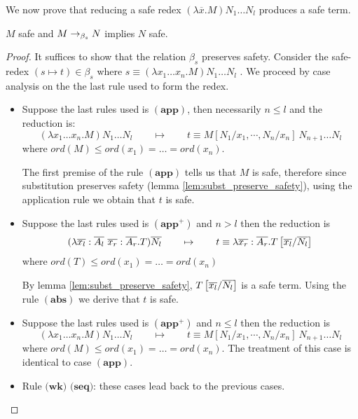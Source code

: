We now prove that reducing a safe redex $(\lambda \overline{x} . M) N_1 \ldots N_l$ produces a safe term.

\begin{lem}
$M$ safe and $M \rightarrow_{\beta_s} N$ implies $N$ safe.
\end{lem}

\begin{proof}
It suffices to show that the relation $\beta_s$ preserves safety.
Consider the safe-redex $(s\mapsto t) \in \beta_s$ where $ s \equiv (\lambda x_1 \ldots x_n . M) N_1 \ldots N_l $ .
We proceed by case analysis on the the last rule used to form the redex.
\begin{itemize}
\item Suppose the last rules used is $\mathbf{(app)}$, then necessarily $n\leq l$ and the reduction is:
$$(\lambda x_1 \ldots x_n . M) N_1 \ldots N_l \qquad \mapsto  \qquad t \equiv M[N_1 / x_1 , \cdots, N_n / x_n]\ N_{n+1} \ldots N_l$$
where $ord(M) \leq ord(x_1) = \ldots = ord(x_n)$.

The first premise of the rule $\mathbf{(app)}$ tells us that $M$ is safe,
therefore since substitution preserves safety (lemma
\ref{lem:subst_preserve_safety}), using the application rule we obtain that $t$ is safe.

\item Suppose the last rules used is $\mathbf{(app^+)}$ and $n> l$ then the reduction is
$$ (\lambda \overline{x_l} : \overline{A_l} \
\overline{x_r}: \overline{A_r} . T) \overline{N_l} \qquad \mapsto
\qquad t \equiv \lambda \overline{x_r}: \overline{A_r} .
T\left[ \overline{x_l}/\overline{N_l} \right]
$$
where $ord(T) \leq ord(x_1) = \ldots = ord(x_n)$

By lemma \ref{lem:subst_preserve_safety}, $T\left[ \overline{x_l}/\overline{N_l} \right]$ is a safe term.
Using the rule $\mathbf{(abs)}$ we derive that $t$ is safe.

\item Suppose the last rules used is $\mathbf{(app^+)}$ and $n\leq l$ then the reduction is
$$(\lambda x_1 \ldots x_n . M) N_1 \ldots N_l \qquad \mapsto \qquad t \equiv M[N_1 / x_1 , \cdots, N_n / x_n]\ N_{n+1} \ldots N_l$$
where $ord(M) \leq ord(x_1) = \ldots = ord(x_n)$. The treatment of this case is identical to case $\mathbf{(app)}$.

\item Rule $\textbf{(wk)}$ $\textbf{(seq)}$: these cases lead back to the previous cases.
\end{itemize}
\end{proof}



